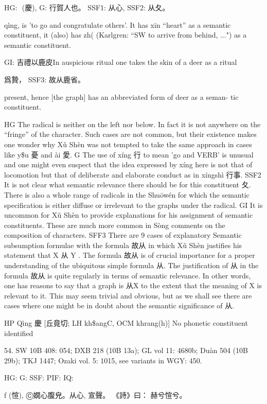 HG:	 (慶),
G:	行賀人也。
SSF1: 从心,
SSF2: 从夂。


qìng,
is 'to go and congratulate others'.
It has xīn ``heart'' as a semantic constituent,
it (also) has zh( (Karlgren: ``SW to arrive from behind, ...") as a semantic constituent.

GI:	吉禮以鹿皮In auspicious ritual one takes the skin of a deer as a ritual

爲贄，
SSF3: 故从鹿省。

present,
hence [the graph] has an abbreviated form of deer as a seman- tic constituent.

HG The radical is neither on the left nor below. In fact it is not anywhere on the ``fringe'' of the character. Such cases are not common, but their existence makes one wonder why Xǔ Shèn was not tempted to take the same approach in cases like y\$u 憂 and ài 愛.
G    The use of xíng 行 to mean 'go and VERB' is unusual and one might even suspect that the idea expressed by xíng here is not that of locomotion but that of deliberate and elaborate conduct as in xíngshì 行事.
SSF2 It is not clear what semantic relevance there should be for this constituent 夂. There is also a whole range of radicals in the Shuōwén for which the semantic specification is either diffuse or irrelevant to the graphs under the radical.
GI It is uncommon for Xǔ Shèn to provide explanations for his assignment of semantic constituents. These are much more common in Sòng comments on the composition of characters.
SFF3 There are 9 cases of explanatory Semantic subsumption formulae with the formula 故从 in which Xǔ Shèn justifies his statement that X 从 Y . The formula 故从 is of crucial importance for a proper understanding of the ubiquitous simple formula 从. The justification of 从 in the formula 故从 is quite regularly in terms of semantic relevance. In other words, one has reasons to say that a graph is 从X to the extent that the meaning of X is relevant to it. This may seem trivial and obvious, but as we shall see there are cases where one might be in doubt about the semantic significance of 从.



HP	Qìng 慶 [丘竟切; LH kh\$angC, OCM khrang(h)] No phonetic constituent identified

54. SW 10B 408: 054; DXB 218 (10B 13a); GL vol 11: 4680b; Duàn 504 (10B 29b); TKJ 1447; Ozaki vol. 5: 1015, see
variants in WGY: 450.


HG:
G: SSF: PIF: IQ:

ƒ (愃),
Ⓒ嫺心腹皃。从心,
宣聲。
《詩》曰： 赫兮愃兮。


